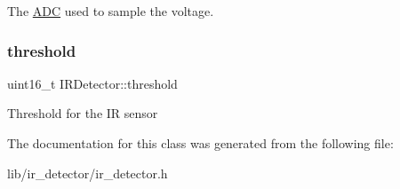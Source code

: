 The \hyperlink{class_a_d_c}{A\+DC} used to sample the voltage. \hypertarget{class_i_r_detector_a81b7870332a3ca41a391c95d5c3f60e4}{}\label{class_i_r_detector_a81b7870332a3ca41a391c95d5c3f60e4} 
\subsubsection{\texorpdfstring{threshold}{threshold}}
{\footnotesize\ttfamily uint16\+\_\+t I\+R\+Detector\+::threshold\hspace{0.3cm}{\ttfamily [private]}}

Threshold for the IR sensor 

The documentation for this class was generated from the following file\+:\begin{DoxyCompactItemize}
\item 
lib/ir\+\_\+detector/ir\+\_\+detector.\+h\end{DoxyCompactItemize}
